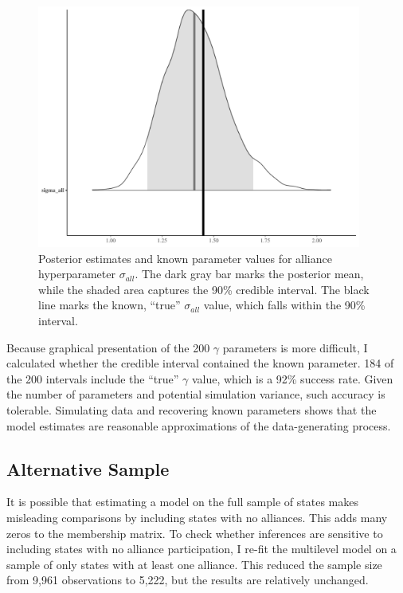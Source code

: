 \documentclass[12pt]{article}
\begin{document}
\begin{figure}[htbp]
	\centering
		\includegraphics[width=0.95\textwidth]{sall-sim-res.pdf}
	\caption{Posterior estimates and known parameter values for alliance hyperparameter $\sigma_{all}$. The dark gray bar marks the posterior mean, while the shaded area captures the 90\% credible interval. The black line marks the known, ``true'' $\sigma_{all}$ value, which falls within the 90\% interval.}
	\label{fig:sall-sim-res}
\end{figure}


Because graphical presentation of the 200 $\gamma$ parameters is more difficult, I calculated whether the credible interval contained the known parameter. 
184 of the 200 intervals include the ``true'' $\gamma$ value, which is a 92\% success rate. 
Given the number of parameters and potential simulation variance, such accuracy is tolerable. 
Simulating data and recovering known parameters shows that the model estimates are reasonable approximations of the data-generating process. 
 



\subsection{Alternative Sample} 


It is possible that estimating a model on the full sample of states makes misleading comparisons by including states with no alliances.
This adds many zeros to the membership matrix. 
To check whether inferences are sensitive to including states with no alliance participation, I re-fit the multilevel model on a sample of only states with at least one alliance. 
This reduced the sample size from 9,961 observations to 5,222, but the results are relatively unchanged. 
\end{document}
